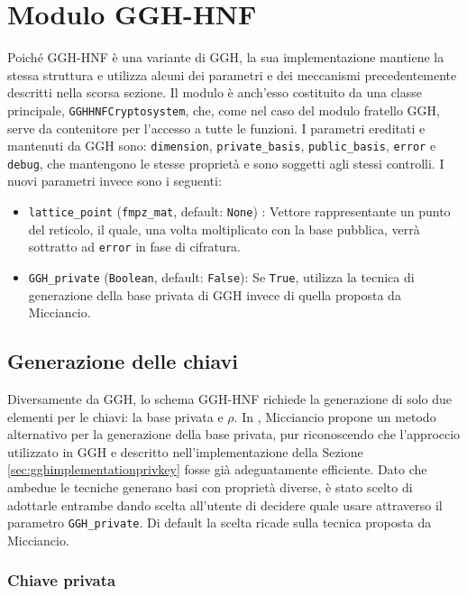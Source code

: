 \section{Modulo GGH-HNF}
\label{sec:moduloggh-hnf}

Poiché GGH-HNF è una variante di GGH, la sua implementazione mantiene la stessa struttura 
e utilizza alcuni dei parametri e dei meccanismi precedentemente descritti nella scorsa sezione.
Il modulo è anch'esso costituito da una classe principale, \texttt{GGHHNFCryptosystem}, che, come nel 
caso del modulo fratello GGH, serve da contenitore per l'accesso a tutte le funzioni.
I parametri ereditati e mantenuti da GGH sono: \texttt{dimension}, \texttt{private\_basis},
\texttt{public\_basis}, \texttt{error} e \texttt{debug}, che mantengono le stesse proprietà
e sono soggetti agli stessi controlli. I nuovi parametri invece sono i seguenti:
\begin{itemize}
    \item \texttt{lattice\_point} (\texttt{fmpz\_mat}, default: \texttt{None}) : 
    Vettore rappresentante un punto del reticolo, il quale, una volta moltiplicato con la
    base pubblica, verrà sottratto ad \texttt{error} in fase di cifratura.
    \item \texttt{GGH\_private} (\texttt{Boolean}, default: \texttt{False}):
    Se \texttt{True}, utilizza la tecnica di generazione della base privata di GGH invece di 
    quella proposta da Micciancio. 
\end{itemize}

\subsection{Generazione delle chiavi}

Diversamente da GGH, lo schema GGH-HNF richiede la generazione di solo due elementi 
per le chiavi: la base privata e $\rho$. In \cite{HNF01}, Micciancio propone un metodo 
alternativo per la generazione della base privata, pur riconoscendo che l'approccio 
utilizzato in GGH e descritto nell'implementazione della Sezione \ref{sec:gghimplementationprivkey} 
fosse già adeguatamente efficiente. Dato che ambedue le tecniche generano basi con 
proprietà diverse, è stato scelto di adottarle entrambe dando scelta all'utente di decidere
quale usare attraverso il parametro \texttt{GGH\_private}. Di default la scelta ricade
sulla tecnica proposta da Micciancio. 

\subsubsection{Chiave privata}

